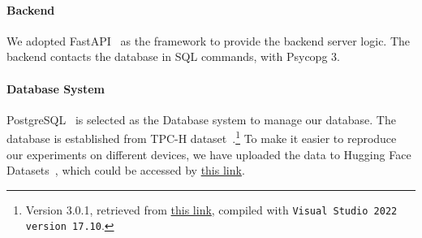 \paragraph{Backend} We adopted FastAPI~\cite{fastapi} as the framework to provide the backend server logic. The backend contacts the database in SQL commands, with Psycopg 3.

\paragraph{Database System} PostgreSQL~\citep{postgres_github} is selected as the Database system to manage our database. The database is established from TPC-H dataset~\cite{poess2000new}.\footnote{Version 3.0.1, retrieved from \href{https://www.tpc.org/TPC_Documents_Current_Versions/download_programs/tools-download-request5.asp?bm_type=TPC-H&bm_vers=3.0.1}{this link}, compiled with \texttt{Visual Studio 2022 version 17.10}.} To make it easier to reproduce our experiments on different devices, we have uploaded the data to Hugging Face Datasets~\cite{lhoest2021datasets}, which could be accessed by \href{https://huggingface.co/datasets/pufanyi/TPC-H}{this link}.



